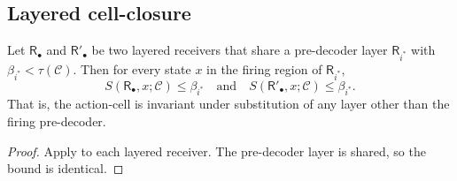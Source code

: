 \documentclass[twocolumn,11pt,a4paper]{article}
\newcommand{\Cell}{\mathcal{C}}
\newcommand{\receiver}{\mathsf{R}}
\begin{document}
\subsection{Layered cell-closure}

\begin{theorem}\label{thm:cell-closure}
Let $\receiver_\bullet$ and $\receiver'_\bullet$ be two layered receivers
that share a pre-decoder layer $\receiver_{i^*}$ with
$\beta_{i^*}<\tau(\Cell)$. Then for every state $x$ in the firing region
of $\receiver_{i^*}$,
\[
S(\receiver_\bullet,x;\Cell)\le\beta_{i^*}\quad\text{and}\quad
S(\receiver'_\bullet,x;\Cell)\le\beta_{i^*}.
\]
That is, the action-cell is invariant under substitution of any layer
other than the firing pre-decoder.
\end{theorem}

\begin{proof}
Apply  to each layered receiver. The pre-decoder
layer is shared, so the bound is identical.
\end{proof}
\end{document}
